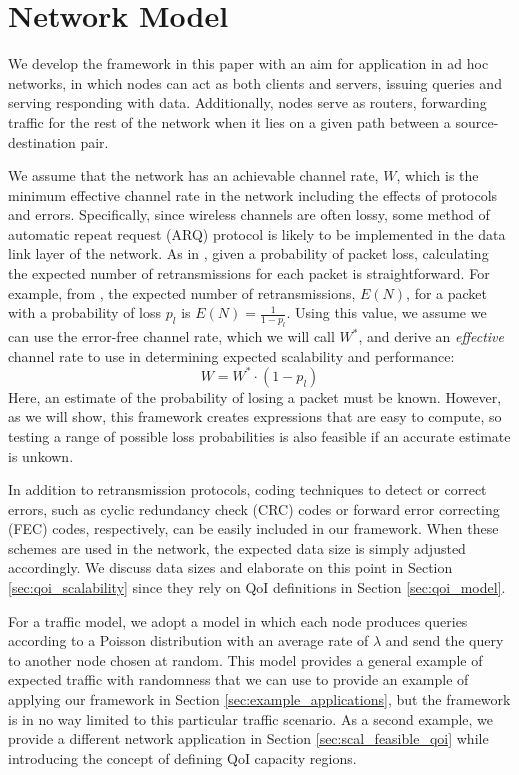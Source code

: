 \section{Network Model}
\label{sec:network_model}

We develop the framework in this paper with an aim for application in ad hoc networks, in which nodes can act as both clients and servers, issuing queries and serving responding with data.  Additionally, nodes serve as routers, forwarding traffic for the rest of the network when it lies on a given path between a source-destination pair.  

We assume that the network has an achievable channel rate, $W$, which is the minimum effective channel rate in the network including the effects of protocols and errors. Specifically, since wireless channels are often lossy, some method of automatic repeat request (ARQ) protocol is likely to be implemented in the data link layer of the network. As in \cite{arq_schemes}, given a probability of packet loss, calculating the expected number of retransmissions for each packet is straightforward. For example, from \cite{arq_schemes}, the expected number of retransmissions, $E(N)$, for a packet with a probability of loss $p_l$ is $E(N) = \frac{1}{1-p_l}$. Using this value, we assume we can use the error-free channel rate, which we will call $W^*$, and derive an \emph{effective} channel rate to use in determining expected scalability and performance:
\begin{equation}
  W = W^* \cdot (1 - p_l)
\end{equation}
Here, an estimate of the probability of losing a packet must be known. However, as we will show, this framework creates expressions that are easy to compute, so testing a range of possible loss probabilities is also feasible if an accurate estimate is unkown.

In addition to retransmission protocols, coding techniques to detect or correct errors, such as cyclic redundancy check (CRC) codes or forward error correcting (FEC) codes, respectively, can be easily included in our framework. When these schemes are used in the network, the expected data size is simply adjusted accordingly. We discuss data sizes and elaborate on this point in Section \ref{sec:qoi_scalability} since they rely on QoI definitions in Section \ref{sec:qoi_model}.

For a traffic model, we adopt a model in which each node produces queries according to a Poisson distribution with an average rate of $\lambda$ and send the query to another node chosen at random.  This model provides a general example of expected traffic with randomness that we can use to provide an example of applying our framework in Section \ref{sec:example_applications}, but the framework is in no way limited to this particular traffic scenario.  As a second example, we provide a different network application in Section \ref{sec:scal_feasible_qoi} while introducing the concept of defining QoI capacity regions.  

